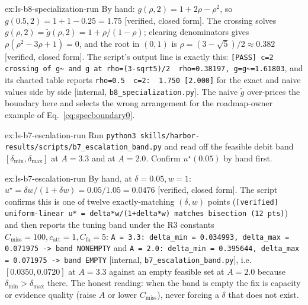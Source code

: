 \documentclass[11pt,a4paper]{article}
\theoremstyle{definition}
\theoremstyle{plain}
\begin{document}
\begin{pdsolution}{ex:ls-b8-specialization-run}
By hand: $g(\rho,2)=1+2\rho-\rho^2$, so $g(0.5,2)=1+1-0.25=1.75$ [verified, closed form]. The crossing solves $g(\rho,2)=\tilde g(\rho,2)=1+\rho/(1-\rho)$; clearing denominators gives $\rho(\rho^2-3\rho+1)=0$, and the root in $(0,1)$ is $\rho=(3-\sqrt5)/2\approx0.382$ [verified, closed form]. The script's output line is exactly this: \texttt{[PASS] c=2 crossing of g\textasciitilde{} and g at rho=(3-sqrt5)/2\ \ rho=0.38197, g=g\textasciitilde{}=1.61803}, and its charted table reports \texttt{rho=0.5\ \ c=2:\ \ 1.750\ [2.000]} for the exact and naive values side by side [internal, \texttt{b8\_specialization.py}]. The naive $\tilde g$ over-prices the boundary here and selects the wrong arrangement for the roadmap-owner example of Eq.~\ref{eq:specboundary0}.
\end{pdsolution}
\begin{pdexercise}[kind=Trace,rating=2]{ex:ls-b7-escalation-run}
Run \texttt{python3 skills/harbor-results/scripts/b7\_escalation\_band.py} and read
off the feasible debit band $[\delta_{\min},\delta_{\max}]$ at $A=3.3$ and at
$A=2.0$. Confirm $u^\star(0.05)$ by hand first.
\end{pdexercise}
\begin{pdsolution}{ex:ls-b7-escalation-run}
By hand, at $\delta=0.05,w=1$: $u^\star=\delta w/(1+\delta w)=0.05/1.05=0.0476$ [verified, closed form]. The script confirms this is one of twelve exactly-matching $(\delta,w)$ points (\texttt{[verified] uniform-linear u* = delta*w\allowbreak/(1+delta*w) matches bisection (12 pts)}) and then reports the tuning band under the R3 constants $C_{\mathrm{miss}}=100,c_{\mathrm{att}}=1,C_{\mathrm{fa}}=5$: \texttt{A = 3.3: delta\_min = 0.034993, delta\_max = 0.071975 -> band NONEMPTY} and \texttt{A = 2.0: delta\_min = 0.395644, delta\_max = 0.071975 -> band EMPTY} [internal, \texttt{b7\allowbreak\_escalation\allowbreak\_band.py}], i.e.\ $[0.0350,0.0720]$ at $A=3.3$ against an empty feasible set at $A=2.0$ because $\delta_{\min}>\delta_{\max}$ there. The honest reading: when the band is empty the fix is capacity or evidence quality (raise $A$ or lower $C_{\mathrm{miss}}$), never forcing a $\delta$ that does not exist.
\end{pdsolution}

\end{document}

